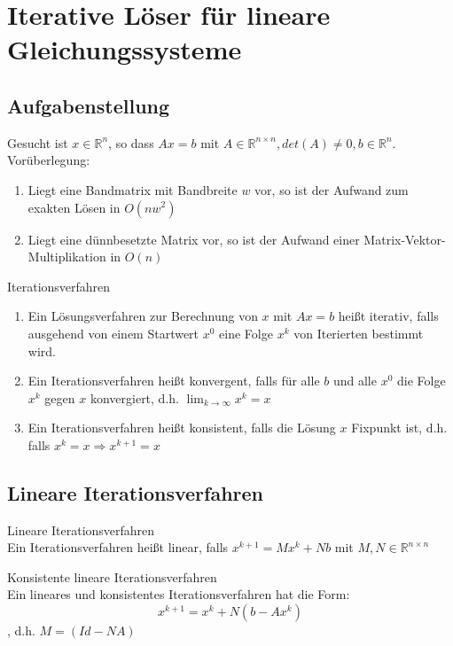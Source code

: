 \section{Iterative Löser für lineare Gleichungssysteme}
\subsection{Aufgabenstellung}
Gesucht ist $x\in \mathbb{R}^{n}$, so dass $Ax=b$ mit $A\in \mathbb{R}^{n\times n}, det(A)\not = 0,b\in \mathbb{R}^{n}$. Vorüberlegung:
\begin{enumerate}
	\item Liegt eine Bandmatrix mit Bandbreite $w$ vor, so ist der Aufwand zum exakten Lösen in $O(nw^{2})$
	\item Liegt eine dünnbesetzte Matrix vor, so ist der Aufwand einer Matrix-Vektor-Multiplikation in $O(n)$
\end{enumerate}

\begin{definition}
	 Iterationsverfahren
	\begin{enumerate}
		\item Ein Lösungsverfahren zur Berechnung von $x$ mit $Ax=b$ heißt iterativ, falls ausgehend
		von einem Startwert $x^{0}$ eine Folge $x^{k}$ von Iterierten bestimmt wird.
		\item Ein Iterationsverfahren heißt konvergent, falls für alle $b$ und alle $x^{0}$ die Folge $x^{k}$ gegen $x$ konvergiert,
		d.h. $\lim_{k\rightarrow \infty} x^{k}=x$
		\item Ein Iterationsverfahren heißt konsistent, falls die Lösung $x$ Fixpunkt ist, d.h. falls $x^{k}=x\Rightarrow x^{k+1}=x$
	\end{enumerate}
\end{definition}

\subsection{Lineare Iterationsverfahren}

\begin{definition}
	 Lineare Iterationsverfahren
	\\
	Ein Iterationsverfahren heißt linear, falls $x^{k+1}=Mx^{k}+Nb$ mit $M,N\in \mathbb{R}^{n\times n}$
\end{definition}

\begin{theorem} Konsistente lineare Iterationsverfahren
\\
Ein lineares und konsistentes Iterationsverfahren hat die Form:
$$x^{k+1}=x^{k}+N(b-Ax^{k})$$, d.h. $M=(Id-NA)$
\end{theorem}

